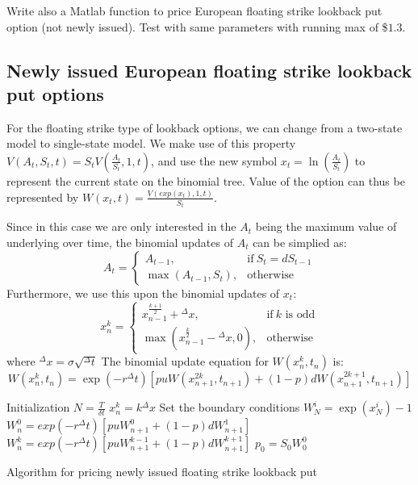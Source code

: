 Write also a Matlab function to price European floating strike lookback put option (not newly issued). Test with same parameters with running max of \$$1.3$.

\subsection{Newly issued European floating strike lookback put options}
For the floating strike type of lookback options, we can change from a two-state model to single-state model. We make use of this property $V(A_{t},S_{t},t) = S_{t}V(\frac{A_{t}}{S_{t}}, 1, t)$, and use the new symbol $x_{t} = \ln(\frac{A_{t}}{S_{t}})$ to represent the current state on the binomial tree. Value of the option can thus be represented by $W(x_{t}, t) = \frac{V(exp(x_{t}), 1, t)}{S_{t}}$.

Since in this case we are only interested in the $A_{t}$ being the maximum value of underlying over time, the binomial updates of $A_{t}$ can be simplied as:
\begin{equation}
  A_{t}=
  \begin{cases}
    A_{t-1}, & \text{if}\ S_{t} = dS_{t-1} \\
    \max(A_{t-1}, S_{t}), & \text{otherwise}
  \end{cases}
\end{equation}
Furthermore, we use this upon the binomial updates of $x_{t}$:
\begin{equation}
  x_{n}^{k}=
  \begin{cases}
    x_{n-1}^{\frac{k+1}{2}} + {^{\Delta}x}, & \text{if}\ k \text{ is odd} \\
    \max(x_{n-1}^{\frac{k}{2}} - {^{\Delta}x}, 0), & \text{otherwise}
  \end{cases}
\end{equation}
where ${^{\Delta}x} = \sigma \sqrt{^{\Delta}t}$
The binomial update equation for $W(x_{n}^{k}, t_{n})$ is:
$$ W(x_{n}^{k}, t_{n}) = \exp(-r{^{\Delta}t})[puW(x_{n+1}^{2k}, t_{n+1}) + (1-p)dW(x_{n+1}^{2k+1}, t_{n+1})] $$
\begin{algorithm}[H]
 Initialization\;
 $N = \frac{T}{\delta t}$\;
 $x_{n}^{k} = k{^{\Delta}x}$\;
 Set the boundary conditions\;
  {
  $W_{N}^{i} = \exp(x_{N}^{i}) - 1$\;
 }
  {
   {
    $W_{n}^{0} = exp(-r{^{\Delta}t})[puW_{n+1}^{0}+(1-p)dW_{n+1}^{1}]$\;
  }
   {
    $W_{n}^{k} = exp(-r{^{\Delta}t})[puW_{n+1}^{k-1}+(1-p)dW_{n+1}^{k+1}]$\;
  }
 }
 $p_{0} = S_{0}W_{0}^{0}$\;
\caption{Algorithm for pricing newly issued floating strike lookback put}
\end{algorithm}
\newpage

